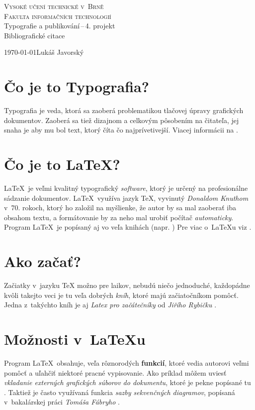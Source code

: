 \documentclass[a4paper, 11pt]{article}
\begin{document}
\begin{titlepage}
	\begin{center}
	\Huge\textsc{Vysoké učení technické v~Brně}\\
	\huge\textsc{Fakulta informačních technologií}\\
	\LARGE Typografie a publikování\,--\,4. projekt\\
	\Huge Bibliografické citace\\
	\end{center}
	{\Large \today \hfill Lukáš Javorský}
\end{titlepage}


\section{Čo je to Typografia?}
Typografia je veda, ktorá sa zaoberá problematikou tlačovej úpravy grafických dokumentov. Zaoberá sa tiež dizajnom a celkovým pôsobením na čitateľa, jej snaha je aby mu bol text, ktorý číta čo najprívetivejší. Viacej informácii na \cite{TypografiaWiki}.

\section{Čo je to \LaTeX?}
\LaTeX\ je veľmi kvalitný typografický \textit{software}, ktorý je určený na profesionálne sádzanie dokumentov. \LaTeX\ vy\-u\-ží\-va jazyk TeX, vyvinutý \textit{Donaldom Knuthom} v~70. rokoch, ktorý ho založil na myšlienke, že autor by sa mal zaoberať iba obsahom textu, a formátovanie by za neho mal urobiť počítač \textit{automaticky}. Program \LaTeX\ je popísaný aj vo veľa knihách (napr. \cite{BookKopka}) Pre viac o~\LaTeX u viz \cite{LatexWiki}.

\section{Ako začať?}
Začiatky v~jazyku TeX možno pre laikov, nebudú niečo jednoduché, každopádne kvôli takejto veci je tu veľa dobrých \textit{kníh}, ktoré majú začiatočníkom pomôcť. Jedna z~takýchto kníh je aj \textit{Latex pro začátečníky} od \textit{Jiřího Rybičku} \cite{BookRybicka}.

\section{Možnosti v~\LaTeX u}
Program \LaTeX\ obsahuje, veľa rôznorodých \textbf{funkcií}, ktoré vedia autorovi veľmi pomôcť a uľahčiť niektoré pracné vypisovanie.
Ako príklad môžem uviesť \textit{vkladanie externých grafických súborov do dokumentu}, ktoré je pekne popísané tu \cite{ThesisBunka}. Taktiež je často využívaná funkcia \textit{sazby sekvenčných diagramov}, popísaná v~bakalárskej práci \textit{Tomáša Fábryho} \cite{ThesisFabry}.
\end{document}
